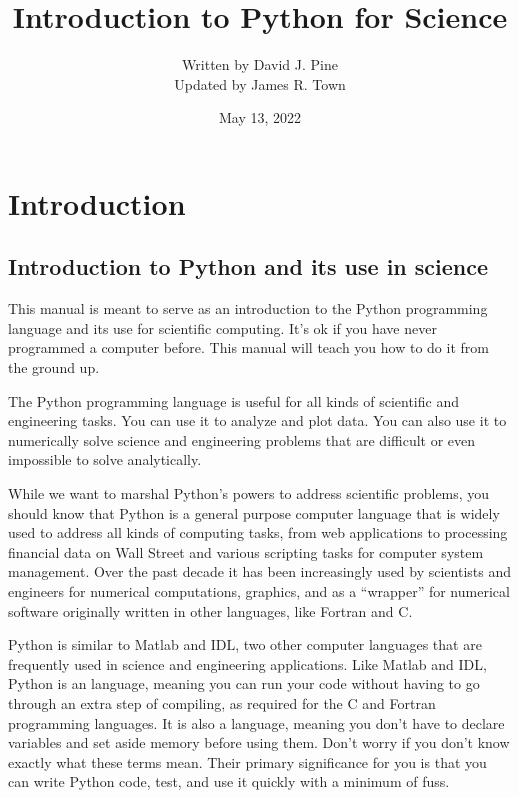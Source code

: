\documentclass[letterpaper,10pt,english]{sphinxmanual}
\title{Introduction to Python for Science}
\date{May 13, 2022}
\author{Written by David J. Pine \\
Updated by James R. Town}
\begin{document}
\pagestyle{empty}
\sphinxmaketitle
\pagestyle{plain}
\sphinxtableofcontents
\pagestyle{normal}
\label{\detokenize{latex-contents::doc}}


\sphinxstepscope


\chapter{Introduction}
\label{\detokenize{chap1/chap1_intro:introduction}}\label{\detokenize{chap1/chap1_intro::doc}}

\section{Introduction to Python and its use in science}
\label{\detokenize{chap1/chap1_intro:introduction-to-python-and-its-use-in-science}}
\sphinxAtStartPar
This manual is meant to serve as an introduction to the Python programming language and its use for scientific computing.  It’s ok if you have never programmed a computer before.  This manual will teach you how to do it from the ground up.

\sphinxAtStartPar
The Python programming language is useful for all kinds of scientific and engineering tasks.  You can use it to analyze and plot data.  You can also use it to numerically solve science and engineering problems that are difficult or even impossible to solve analytically.

\sphinxAtStartPar
While we want to marshal Python’s powers to address scientific problems, you should know that Python is a general purpose computer language that is widely used to address all kinds of computing tasks, from web applications to processing financial data on Wall Street and various scripting tasks for computer system management.  Over the past decade it has been increasingly used by scientists and engineers for numerical computations, graphics, and as a “wrapper” for numerical software originally written in other languages, like Fortran and C.

\sphinxAtStartPar
Python is similar to Matlab and IDL, two other computer languages that are frequently used in science and engineering applications.  Like Matlab and IDL, Python is an  language, meaning you can run your code without having to go through an extra step of compiling, as required for the C and Fortran programming languages.  It is also a  language, meaning you don’t have to declare variables and set aside memory before using them. Don’t worry if you don’t know exactly what these terms mean. Their primary significance for you is that you can write Python code, test, and use it quickly with a minimum of fuss.
\end{document}
